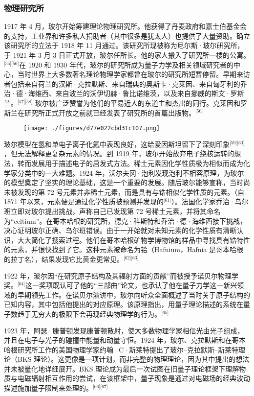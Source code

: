 \subsubsection{物理研究所}
1917 年 4 月，玻尔开始筹建理论物理研究所。他获得了丹麦政府和嘉士伯基金会的支持，工业界和许多私人捐助者（其中很多是犹太人）也提供了大量资助。确立该研究所的立法于 1918 年 11 月通过。该研究所现被称为尼尔斯·玻尔研究所，于 1921 年 3 月 3 日正式开放，玻尔任所长。他的家人搬入了研究所一楼的公寓。\(^\text{[55][56]}\)在 1920 和 1930 年代，玻尔的研究所成为量子力学及相关领域研究者的中心，当时世界上大多数著名理论物理学家都曾在玻尔的研究所短暂停留。早期来访者包括来自荷兰的汉斯·克拉默斯、来自瑞典的奥斯卡·克莱因、来自匈牙利的乔治·德·海维西、来自波兰的沃伊切赫·鲁比诺维茨，以及来自挪威的斯文·罗斯兰。\(^\text{[57][58]}\) 玻尔被广泛赞誉为他们的平易近人的东道主和杰出的同行。克莱因和罗斯兰在研究所正式开放之前就已经发表了研究所的首篇出版物。\(^\text{[56]}\)
\begin{figure}[ht]
\centering
\texttt{[image: ./figures/d77e022cbd31c107.png]}
\caption{} \label{fig_NRSbr_6}
\end{figure}
玻尔模型在氢和单电子离子化氦中表现良好，这给爱因斯坦留下了深刻印象\(^\text{[59][60]}\)，但无法解释更复杂元素的情况。到 1919 年，玻尔开始放弃电子绕核运转的想法，转而发展用于描述电子的启发式方法。稀土元素因化学性质极为相似而成为化学家分类中的一大难题。1924 年，沃尔夫冈·泡利发现泡利不相容原理，为玻尔的模型奠定了坚实的理论基础，这是一个重要的发展。随后玻尔能够宣称，当时尚未被发现的第 72 号元素并非稀土元素，而是具有与锆相似化学性质的元素。（自 1871 年以来，元素便是通过化学性质被预测并发现的\(^\text{[61]}\)）。法国化学家乔治·乌尔班立即对玻尔提出挑战，声称自己已发现第 72 号稀土元素，并将其命名为“celtium”。在哥本哈根的研究所，德克·科斯特和乔治·德·海维西接下挑战，决心证明玻尔正确、乌尔班错误。由于一开始就对未知元素的化学性质有清晰认识，大大简化了搜索过程。他们在哥本哈根矿物学博物馆的样品中寻找具有锆特性的元素，并很快找到了它。这种元素被命名为铪（Hafnium，Hafnia 是哥本哈根的拉丁名），结果发现它比黄金更常见。\(^\text{[62][63]}\)

1922 年，玻尔因“在研究原子结构及其辐射方面的贡献”而被授予诺贝尔物理学奖。\(^\text{[64]}\)这一奖项既认可了他的“三部曲”论文，也承认了他在量子力学这一新兴领域的早期领先工作。在诺贝尔演讲中，玻尔向听众全面概述了当时关于原子结构的已知内容，其中包括他提出的对应原理。该原理指出，用量子理论描述的系统在量子数趋于无穷大的极限下会再现经典物理学的行为。\(^\text{[65]}\)

1923 年，阿瑟·康普顿发现康普顿散射，使大多数物理学家相信光由光子组成，并且在电子与光子的碰撞中能量和动量守恒。1924 年，玻尔、克拉默斯和在哥本哈根研究所工作的美国物理学家约翰·C·斯莱特提出了玻尔–克拉默斯–斯莱特理论（BKS 理论）。这更像是一项计划，而非完整的物理理论，因为其中提出的想法并未被量化地详细展开。BKS 理论成为最后一次试图在旧量子理论框架下理解物质与电磁辐射相互作用的尝试，在该框架中，量子现象是通过对电磁场的经典波动描述施加量子限制来处理的。\(^\text{[66][67]}\)

